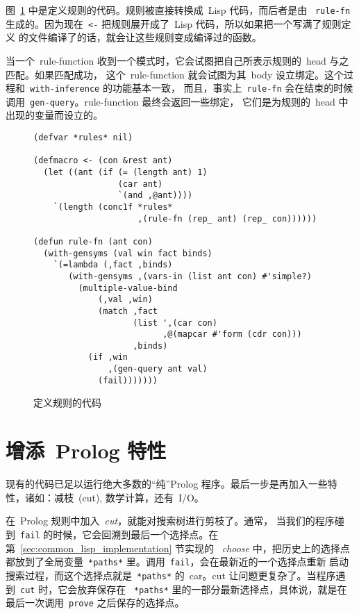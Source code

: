 图~\ref{fig:code_for_defining_rules} 中是定义规则的代码。规则被直接转换成~Lisp 代码，而后者是由
~\verb|rule-fn| 生成的。因为现在~\verb|<-| 把规则展开成了~Lisp 代码，所以如果把一个写满了规则定义
的文件编译了的话，就会让这些规则变成编译过的函数。

当一个~rule-function 收到一个模式时，它会试图把自己所表示规则的~head 与之匹配。如果匹配成功，
这个~rule-function 就会试图为其~body 设立绑定。这个过程和~\verb|with-inference| 的功能基本一致，
而且，事实上~\verb|rule-fn| 会在结束的时候调用~\verb|gen-query|。rule-function 最终会返回一些绑定，
它们是为规则的~head 中出现的变量而设立的。

\begin{figure}
\begin{lstlisting}
(defvar *rules* nil)

(defmacro <- (con &rest ant)
  (let ((ant (if (= (length ant) 1)
                 (car ant)
                 `(and ,@ant))))
    `(length (conc1f *rules*
                     ,(rule-fn (rep_ ant) (rep_ con))))))

(defun rule-fn (ant con)
  (with-gensyms (val win fact binds)
    `(=lambda (,fact ,binds)
       (with-gensyms ,(vars-in (list ant con) #'simple?)
         (multiple-value-bind
             (,val ,win)
             (match ,fact
                    (list ',(car con)
                          ,@(mapcar #'form (cdr con)))
                    ,binds)
           (if ,win
               ,(gen-query ant val)
             (fail)))))))
\end{lstlisting}
\caption{定义规则的代码}
\label{fig:code_for_defining_rules}
\end{figure}

\section{增添~Prolog 特性}
\label{sec:adding_prolog_features}

现有的代码已足以运行绝大多数的``纯''Prolog 程序。最后一步是再加入一些特性，诸如：减枝~(cut), 数学计算，还有~\textsc{I/O}。

在~Prolog 规则中加入~\emph{cut}，就能对搜索树进行剪枝了。通常，
当我们的程序碰到~\verb|fail| 的时候，它会回溯到最后一个选择点。在第~\ref{sec:common_lisp_implementation} 节实现的
~\emph{choose} 中，把历史上的选择点都放到了全局变量~\verb|*paths*| 里。调用~\verb|fail|，会在最新近的一个选择点重新
启动搜索过程，而这个选择点就是~\verb|*paths*| 的~car。cut 让问题更复杂了。当程序遇到~\verb|cut| 时，它会放弃保存在
~\verb|*paths*| 里的一部分最新选择点，具体说，就是在最后一次调用~\verb|prove| 之后保存的选择点。

